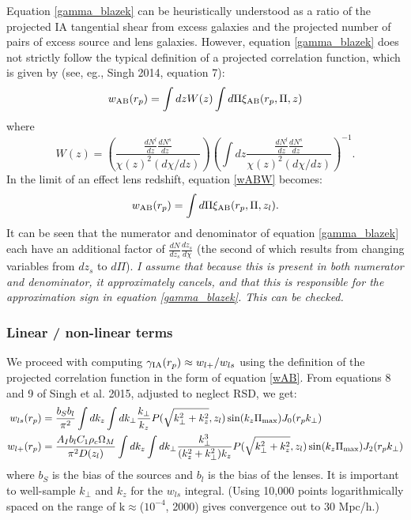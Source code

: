 \documentclass[onecolumn,amsmath,aps,fleqn, superscriptaddress]{revtex4}
\begin{document}
Equation \ref{gamma_blazek} can be heuristically understood as a ratio of the projected IA tangential shear from excess galaxies and the projected number of pairs of excess source and lens galaxies. However, equation \ref{gamma_blazek} does not strictly follow the typical definition of a projected correlation function, which is given by (see, eg., Singh 2014, equation 7):
\begin{equation}
w_{\rm AB}(r_p) = \int dz W(z) \int d\Pi \xi_{\rm AB}(r_p, \Pi, z)
\label{wABW}
\end{equation}
where 
\begin{equation}
W(z) = \left(\frac{\frac{dN^l}{dz}\frac{dN^s}{dz}}{\chi(z)^2 (d\chi/dz)}\right) \left(\int dz \frac{\frac{dN^l}{dz}\frac{dN^s}{dz}}{\chi(z)^2 (d\chi/dz)}\right)^{-1}.
\label{wz}
\end{equation}
In the limit of an effect lens redshift, equation \ref{wABW} becomes:
\begin{equation}
w_{\rm AB}(r_p) = \int d\Pi \xi_{\rm AB}(r_p, \Pi, z_l).
\label{wAB}
\end{equation}
It can be seen that the numerator and denominator of equation \ref{gamma_blazek} each have an additional factor of $\frac{dN}{dz_s}\frac{dz_s}{d\chi}$ (the second of which results from changing variables from $dz_s$ to $d\Pi$). {\it I assume that because this is present in both numerator and denominator, it approximately cancels, and that this is responsible for the approximation sign in equation \ref{gamma_blazek}. This can be checked.} 

\subsubsection*{Linear / non-linear terms}
We proceed with computing $\gamma_{\rm IA}(r_p) \approx w_{l+} / w_{ls}$ using the definition of the projected correlation function in the form of equation \ref{wAB}. From equations 8 and 9 of Singh et al. 2015, adjusted to neglect RSD, we get:
\begin{align}
w_{ls}(r_p) &= \frac{b_S b_l}{\pi^2} \int dk_z  \int dk_\perp  \frac{k_\perp}{k_z} P(\sqrt{k_\perp^2 + k_z^2}, z_l) \sin(k_z \Pi_{\rm max}) J_0(r_p k_\perp) \nonumber \\
w_{l+}(r_p) &= \frac{A_I b_l C_1 \rho_c \Omega_M}{\pi^2 D(z_l)} \int dk_z  \int dk_\perp  \frac{k_\perp^3 }{(k_z^2 + k_\perp^2)k_z} P(\sqrt{k_\perp^2 + k_z^2}, z_l) \sin(k_z \Pi_{\rm max}) J_2(r_p k_\perp)
\label{ws}
\end{align}
where $b_S$ is the bias of the sources and $b_l$ is the bias of the lenses. It is important to well-sample $k_\perp$ and $k_z$ for the $w_{ls}$ integral. (Using 10,000 points logarithmically spaced on the range of k$\approx$($10^{-4}$, 2000) gives convergence out to $30$ Mpc/h.)
\end{document}
